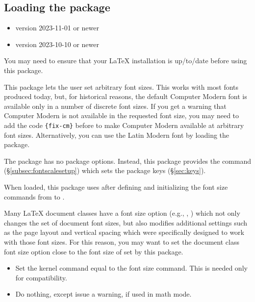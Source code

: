 \documentclass{beery}
\begin{document}
\subsection{Loading the package}
\label{subsec:loading}

\begin{itemize}
  \item \LaTeXe{} version 2023-11-01 or newer
  \item {} version 2023-10-10 or newer
\end{itemize}

You may need to ensure that your \LaTeX{} installation is up\-/to\-/date before using this package.

This package lets the user set arbitrary font sizes.
This works with most fonts produced today, but, for historical reasons, the default Computer Modern font is available only in a number of discrete font sizes.
If you get a warning that Computer Modern is not available in the requested font size, you may need to add the code \allowbreak\verb|{fix-cm}| before  to make Computer Modern available at arbitrary font sizes.
Alternatively, you can use the Latin Modern font by loading the  package.

The  package has no package options.
Instead, this package provides the command  (\S\ref{subsec:fontscalesetup}) which sets the package keys (\S\ref{sec:keys}).

When loaded, this package uses  after defining and initializing the font size commands from  to .

Many \LaTeX{} document classes have a font size option (e.g.\@ \Key{10pt}, \Key{11pt}, \Key{12pt}) which not only changes the set of document font sizes, but also modifies additional settings such as the page layout and vertical spacing which were specifically designed to work with those font sizes.
For this reason, you may want to set the document class font size option close to the font size of  set by this package.

\begin{itemize}
  \item
  Set the kernel command  equal to the font size command.
  This is needed only for compatibility.
  \item
  Do nothing, except issue a warning, if used in math mode.
\end{itemize}
\end{document}
